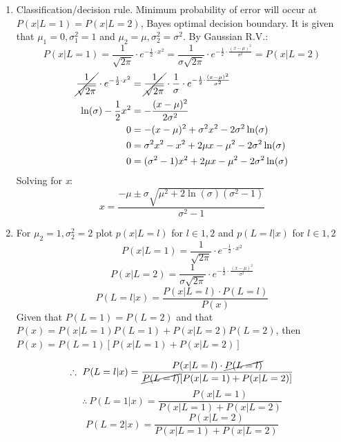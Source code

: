 \documentclass[12pt,A4]{article}
\begin{document}
\begin{enumerate}
    \item Classification/decision rule. Minimum probability of error will occur at $P(x|L=1) = P(x|L=2)$, Bayes optimal decision boundary. It is given that $\mu_1=0, \sigma_1^2=1$ and $\mu_2=\mu, \sigma_2^2=\sigma^2$. By Gaussian R.V.:
    \begin{equation*}
    P(x|L=1) = \frac{1}{\sqrt{2\pi}} \cdot e^{-\frac{1}{2} \cdot x^2} = \frac{1}{\sigma\sqrt{2\pi}} \cdot e^{-\frac{1}{2} \cdot \frac{(x-\mu)^2}{\sigma^2}} = P(x|L=2)
    \end{equation*}
    \begin{align*}
        \cancel{\frac{1}{\sqrt{2\pi}}} \cdot e^{-\frac{1}{2} \cdot x^2} &= \cancel{\frac{1}{\sqrt{2\pi}}} \cdot \frac{1}{\sigma} \cdot e^{-\frac{1}{2} \cdot \frac{(x-\mu)^2}{\sigma^2}}\\
        \ln(\sigma) - \frac{1}{2}x^2 &= -\frac{(x-\mu)^2}{2\sigma^2} \\
        0 &= -(x-\mu)^2 + \sigma^2x^2 - 2\sigma^2\ln(\sigma)\\
        0 &= \sigma^2x^2 - x^2 + 2\mu x - \mu^2 - 2\sigma^2\ln(\sigma) \\
        0 &= (\sigma^2 - 1)x^2 + 2\mu x - \mu^2 - 2\sigma^2\ln(\sigma)
    \end{align*}
    Solving for \textit{x}:
    $$\boxed{x = \frac{-\mu \pm \sigma\sqrt{\mu^2 + 2\ln(\sigma)(\sigma^2 - 1)}}{\sigma^2 - 1}}$$
    
    \item For $\mu_2 = 1, \sigma_2^2 = 2$ plot $p(x|L=l)$ for $l\in 1, 2$ and $p(L=l|x)$ for $l\in 1, 2$
    $$P(x|L=1) = \frac{1}{\sqrt{2\pi}} \cdot e^{-\frac{1}{2} \cdot x^2}$$
    $$P(x|L=2) = \frac{1}{\sigma\sqrt{2\pi}} \cdot e^{-\frac{1}{2} \cdot \frac{(x-\mu)^2}{\sigma^2}}$$
    $$P(L=l|x)=\frac{P(x|L=l) \cdot P(L=l)}{P(x)}$$
    Given that $P(L=1) = P(L=2)$ and that $P(x) = P(x|L=1)P(L=1) + P(x|L=2)P(L=2)$, then $P(x) = P(L=1)[P(x|L=1) + P(x|L=2)]$
    
    $$\therefore \ P(L=l|x)=\frac{P(x|L=l) \cdot \cancel{P(L=l)}}{\cancel{P(L=l)}[P(x|L=1) + P(x|L=2)]}$$
    $$\therefore \ P(L=1|x)=\frac{P(x|L=1)}{P(x|L=1) + P(x|L=2)}$$
    $$P(L=2|x)=\frac{P(x|L=2)}{P(x|L=1) + P(x|L=2)}$$
    

\end{enumerate}
\end{document}

